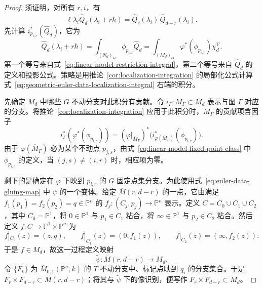 \begin{proof}
须证明，对所有 $r,i$，有
\begin{equation}\label{eq:geometric-euler-data-gluing-target}
\ell\lambda_i\widehat Q_d(\lambda_i+r\hbar)
=\overline{\widehat Q_r(\lambda_i)}\,\widehat Q_{d-r}(\lambda_i).
\end{equation}
先计算 $i_{p_{i,r}}^*(\widehat Q_d)$，它为
\begin{equation}\label{eq:geometric-euler-data-localization-integral}
\widehat Q_d(\lambda_i+r\hbar)
=\int_{(N_d)_G}\phi_{p_{i,r}}\widehat Q_d
=\int_{(M_d)_G}\varphi^*(\phi_{p_{i,r}})\chi_d^{\mathcal V}.
\end{equation}
第一个等号来自式~\eqref{eq:linear-model-restriction-integral}，第二个等号来自 $\widehat Q_d$ 的定义和投影公式。策略是用推论~\ref{cor:localization-integration} 的局部化公式计算式~\eqref{eq:geometric-euler-data-localization-integral} 右端的积分。

先确定 $M_d$ 中哪些 $G$ 不动分支对此积分有贡献。令 $i_\Gamma:\overline M_\Gamma\subset M_d$ 表示与图 $\Gamma$ 对应的分支。将推论~\ref{cor:localization-integration} 应用于此积分时，$\overline M_\Gamma$ 的贡献项含因子
\[
i_\Gamma^*(\varphi^*(\phi_{p_{i,r}}))
=(\varphi|_{\overline M_\Gamma})^*\bigl(i_{\varphi(\overline M_\Gamma)}^*(\phi_{p_{i,r}})\bigr).
\]
由于 $\varphi(\overline M_\Gamma)$ 必为某个不动点 $p_{j,s}$，由式~\eqref{eq:linear-model-fixed-point-class} 中 $\phi_{p_{i,r}}$ 的定义，当 $(j,s)\ne(i,r)$ 时，相应项为零。

剩下的是确定在 $\varphi$ 下映到 $p_{i,r}$ 的 $G$ 固定点集分支。为此使用式~\eqref{eq:euler-data-gluing-map} 中 $\psi$ 的一个变体。给定 $\overline M(r,d-r)$ 的一点，它由满足 $f_1(p_1)=f_2(p_2)=q\in\mathbb P^n$ 的 $f_j:(C_j,p_j)\to\mathbb P^n$ 表示。定义 $C=C_0\cup C_1\cup C_2$，其中 $C_0=\mathbb P^1$，将 $0\in\mathbb P^1$ 与 $p_1\in C_1$ 粘合，将 $\infty\in\mathbb P^1$ 与 $p_2\in C_2$ 粘合。然后定义 $f:C\to\mathbb P^1\times\mathbb P^n$ 为
\[
f|_{C_0}(z)=(z,q),\qquad f|_{C_1}(z)=(0,f_1(z)),
\qquad f|_{C_2}(z)=(\infty,f_2(z)).
\]
于是 $f\in M_d$，故这一过程定义映射
\begin{equation}\label{eq:euler-data-graph-gluing-map}
\widetilde\psi:\overline M(r,d-r)\longrightarrow M_d.
\end{equation}
令 $\{F_k\}$ 为 $\overline M_{0,1}(\mathbb P^n,k)$ 的 $T$ 不动分支中、标记点映到 $q_i$ 的分支集合。于是 $F_r\times F_{d-r}\subset\overline M(r,d-r)$；将其与 $\widetilde\psi$ 下的像识别，便写作 $F_r\times F_{d-r}\subset M_d$。


\end{proof}
